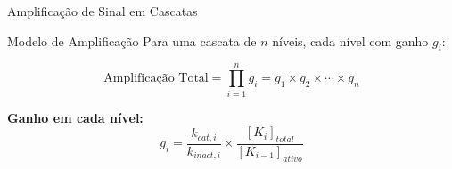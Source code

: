 \begin{frame}{Amplificação de Sinal em Cascatas}
\begin{block}{Modelo de Amplificação}
Para uma cascata de $n$ níveis, cada nível com ganho $g_i$:

\begin{equation*}
\text{Amplificação Total} = \prod_{i=1}^{n} g_i = g_1 \times g_2 \times \cdots \times g_n
\end{equation*}

\textbf{Ganho em cada nível:}
\begin{equation*}
g_i = \frac{k_{cat,i}}{k_{inact,i}} \times \frac{[K_i]_{total}}{[K_{i-1}]_{ativo}}
\end{equation*}
\end{block}

\end{frame}


